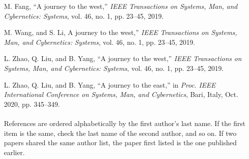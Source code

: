




  \begin{thebibliography}{10}


M. Fang, ``A journey to the west,'' {\em IEEE Transactions on Systems, Man, and Cybernetics: Systems}, vol. 46, no. 1, pp. 23--45,
2019.

M. Wang, and S. Li, A journey to the west,'' {\em IEEE Transactions on Systems, Man, and Cybernetics: Systems}, vol. 46, no. 1, pp. 23--45,
2019.

 L. Zhao, Q. Liu, and B. Yang, ``A journey to the west,'' {\em IEEE Transactions on Systems, Man, and Cybernetics: Systems}, vol. 46, no. 1, pp. 23--45,
2019.

 L. Zhao, Q. Liu, and B. Yang, ``A journey to the east,'' in {\em Proc. IEEE International Conference on Systems, Man, and Cybernetics}, Bari, Italy,
Oct. 2020, pp. 345--349. 
\\
\\
References are
ordered alphabetically by the first author's last name. If the first item is the same, check the last name of the second author, and so on. If two papers shared the same author list, the paper first listed is the one published earlier.



\end{thebibliography}



























